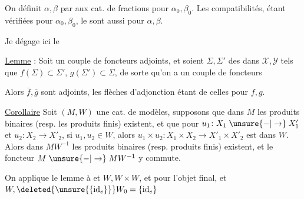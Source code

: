 
On définit $\alpha,\beta$ par  aux cat. de fractions pour $\alpha_0,\beta_0$. Les compatibilités, étant vérifiées pour $\alpha_0,\beta_0$, le sont aussi pour $\alpha,\beta$. 

Je dégage ici le

\uline{Lemme}  : Soit
un couple de foncteurs adjoints, et soient $\Sigma,\Sigma'$ des  dans $\mathcal X,\mathcal Y$ tels que $f(\Sigma)\subset\Sigma'$, $g(\Sigma')\subset\Sigma$, de sorte qu'on a un couple de foncteurs

Alors $\bar f,\bar g$ sont adjoints, les flèches d'adjonction étant  de celles pour $f,g$.

\uline{Corollaire} Soit $(M,W)$ une cat. de modèles,  supposons que dans $M$ les produits binaires (resp. les produits finis) existent, et que  pour $u_1\colon X_1\mathrel{\unsure{-|\to}} X'_1$ et $u_2\colon X_2\to X'_2$, si $u_1,u_2\in W$, alors $u_1\times u_2\colon X_1\times X_2\to X'_1\times X'_2$ est dans $W$. Alors dans $MW^{-1}$ les produits binaires (resp. produits finis) existent, et le foncteur  $M\mathrel{\unsure{-|\to}} MW^{-1}$ y commute.

On applique le lemme à
et $W,W\times W$, et pour l'objet final,
et $W,\deleted{\unsure{\{\mathrm{id}_e\}}}W_0=\{\mathrm{id}_e\}$
